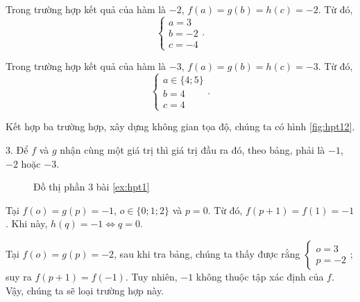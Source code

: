 Trong trường hợp kết quả của hàm là $-2$, $f(a) = g(b) = h(c) = -2$. Từ đó,
$$
\begin{cases}
   a = 3\\
   b = -2\\
   c = -4
\end{cases}.
$$

Trong trường hợp kết quả của hàm là $-3$, $f(a) = g(b) = h(c) = -3$. Từ đó,
$$
\begin{cases}
   a \in \{4; 5\}\\
   b = 4\\
   c = 4
\end{cases}.
$$

Kết hợp ba trường hợp, xây dựng không gian tọa độ, chúng ta có hình \ref{fig:hpt12}.

3. Để $f$ và $g$ nhận cùng một giá trị thì giá trị đầu ra đó, theo bảng, phải là $-1$, $-2$ hoặc $-3$.

\begin{wrapfigure}{L}{0.4\textwidth}
   \centering
   \caption{Đồ thị phần 3 bài \ref{ex:hpt1}}
   \label{fig:hpt13}
\end{wrapfigure}

Tại $f(o) = g(p) = -1$, $o \in \{0; 1; 2\}$ và $p = 0$. Từ đó, $f(p + 1) = f(1) = -1$. Khi này, $h(q) = -1 \iff q = 0$.

Tại $f(o) = g(p) = -2$, sau khi tra bảng, chúng ta thấy được rằng $\begin{cases}o = 3\\p = -2\end{cases}$; suy ra $f(p + 1) = f(-1)$. Tuy nhiên, $-1$ không thuộc tập xác định của $f$. Vậy, chúng ta sẽ loại trường hợp này.


